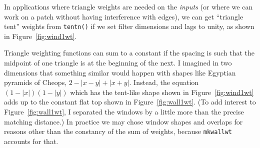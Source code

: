 \par
In applications where triangle weights are needed on the {\it inputs}
(or where we can work on a patch
without having interference with edges),
we can get ``triangle tent'' weights
from {\tt tentn()} if we set filter dimensions and lags to unity,
as shown in Figure~\ref{fig:wind1wt}.
\par
    Triangle weighting functions
can sum to a constant
if the spacing is such that the midpoint of one triangle
is at the beginning of the next.
I imagined in two dimensions that something similar would happen
with shapes like Egyptian pyramids of Cheops, $2-|x-y|+|x+y|$.
Instead,
the equation $(1-|x|)(1-|y|)$
which has the tent-like shape shown
in Figure~\ref{fig:wind1wt}
adds up to the constant flat top shown in Figure~\ref{fig:wall1wt}.
(To add interest to Figure~\ref{fig:wall1wt},
I separated the windows by a little more than the precise matching distance.)
In practice we may chose window shapes and overlaps for
reasons other than the constancy of the sum of weights,
because \texttt{mkwallwt}  accounts for that.



%


